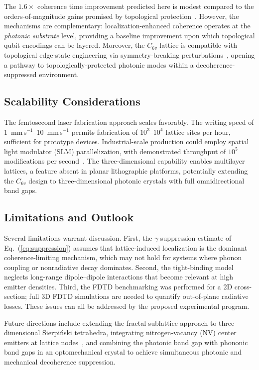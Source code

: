 \documentclass[10pt,letterpaper]{article}
\begin{document}
The $1.6\times$ coherence time improvement predicted here is modest compared to the orders-of-magnitude gains promised by topological protection~\cite{Kitaev2003}. However, the mechanisms are complementary: localization-enhanced coherence operates at the \textit{photonic substrate} level, providing a baseline improvement upon which topological qubit encodings can be layered. Moreover, the $C_{6v}$ lattice is compatible with topological edge-state engineering via symmetry-breaking perturbations~\cite{Ozawa2019,Wu2017}, opening a pathway to topologically-protected photonic modes within a decoherence-suppressed environment.

\subsection{Scalability Considerations}

The femtosecond laser fabrication approach scales favorably. The writing speed of 1~mm\,s$^{-1}$--10~mm\,s$^{-1}$ permits fabrication of $10^3$--$10^4$ lattice sites per hour, sufficient for prototype devices. Industrial-scale production could employ spatial light modulator (SLM) parallelization, with demonstrated throughput of $10^5$ modifications per second~\cite{Davis1996}. The three-dimensional capability enables multilayer lattices, a feature absent in planar lithographic platforms, potentially extending the $C_{6v}$ design to three-dimensional photonic crystals with full omnidirectional band gaps.

\subsection{Limitations and Outlook}

Several limitations warrant discussion. First, the $\gamma$ suppression estimate of Eq.~(\ref{eq:suppression}) assumes that lattice-induced localization is the dominant coherence-limiting mechanism, which may not hold for systems where phonon coupling or nonradiative decay dominates. Second, the tight-binding model neglects long-range dipole--dipole interactions that become relevant at high emitter densities. Third, the FDTD benchmarking was performed for a 2D cross-section; full 3D FDTD simulations are needed to quantify out-of-plane radiative losses. These issues can all be addressed by the proposed experimental program.

Future directions include extending the fractal sublattice approach to three-dimensional Sierpi\'{n}ski tetrahedra, integrating nitrogen-vacancy (NV) center emitters at lattice nodes~\cite{Aharonovich2016,Childress2006}, and combining the photonic band gap with phononic band gaps in an optomechanical crystal to achieve simultaneous photonic and mechanical decoherence suppression.
\end{document}
